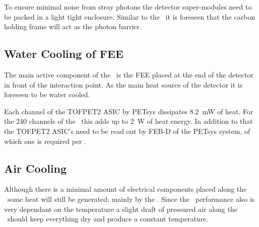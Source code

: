 \documentclass[../BTOF_summary.tex]{subfiles}
\begin{document}
To ensure minimal noise from stray photons the detector super-modules need to be packed in a light tight enclosure.
Similar to the \bdirc\ it is foreseen that the carbon holding frame will act as the photon barrier.

\subsection{Water Cooling of FEE}

The main active component of the \btofD\ is the FEE placed at the end of the detector in front of the interaction point. As the main heat source of the detector it is foreseen to be water cooled.

Each channel of the TOFPET2 ASIC by PETsys dissipates \SI{8.2}{mW} of heat.
For the 240 channels of the \sm\ this adds up to \SI{2}{W} of heat energy.
In addition to that the TOFPET2 ASIC's need to be read out by FEB-D of the PETsys system, of which one is required per \sm .


\subsection{Air Cooling}

Although there is a minimal amount of electrical components placed along the \railboard\ some heat will still be generated; mainly by the \sipms .
Since the \sipm\ performance also is very dependant on the temperature a slight draft of pressured air along the \railboard\ should keep everything dry and produce a constant temperature.
\end{document}
